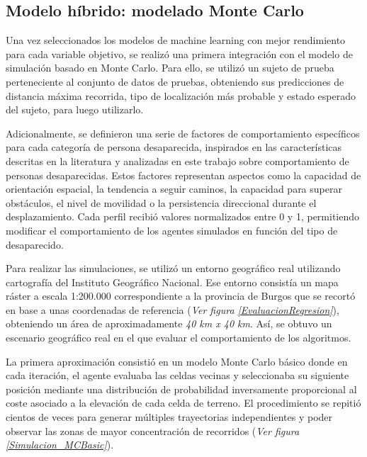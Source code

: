 \subsection{Modelo híbrido: modelado Monte Carlo}

Una vez seleccionados los modelos de machine learning con mejor rendimiento para cada variable objetivo, se realizó una primera integración con el modelo de simulación basado en Monte Carlo. Para ello, se utilizó un sujeto de prueba perteneciente al conjunto de datos de pruebas, obteniendo sus predicciones de distancia máxima recorrida, tipo de localización más probable y estado esperado del sujeto, para luego utilizarlo.

Adicionalmente, se definieron una serie de factores de comportamiento específicos para cada categoría de persona desaparecida, inspirados en las características descritas en la literatura y analizadas en este trabajo sobre comportamiento de personas desaparecidas. Estos factores representan aspectos como la capacidad de orientación espacial, la tendencia a seguir caminos, la capacidad para superar obstáculos, el nivel de movilidad o la persistencia direccional durante el desplazamiento. Cada perfil recibió valores normalizados entre 0 y 1, permitiendo modificar el comportamiento de los agentes simulados en función del tipo de desaparecido.


\vspace{3cm}

Para realizar las simulaciones, se utilizó un entorno geográfico real utilizando cartografía del Instituto Geográfico Nacional\cite{IGNPortal}. Ese entorno consistía un mapa ráster a escala 1:200.000 correspondiente a la provincia de Burgos que se recortó en base a unas coordenadas de referencia (\textit{Ver figura \ref{EvaluacionRegresion}}), obteniendo un área de aproximadamente \textit{40 km x 40 km}. Así, se obtuvo un escenario geográfico real en el que evaluar el comportamiento de los algoritmos.


La primera aproximación consistió en un modelo Monte Carlo básico  donde en cada iteración, el agente evaluaba las celdas vecinas y seleccionaba su siguiente posición mediante una distribución de probabilidad inversamente proporcional al coste asociado a la elevación de cada celda de terreno. El procedimiento se repitió cientos de veces para generar múltiples trayectorias independientes y poder observar las zonas de mayor concentración de recorridos (\textit{Ver figura \ref{Simulacion_MCBasic}}).


